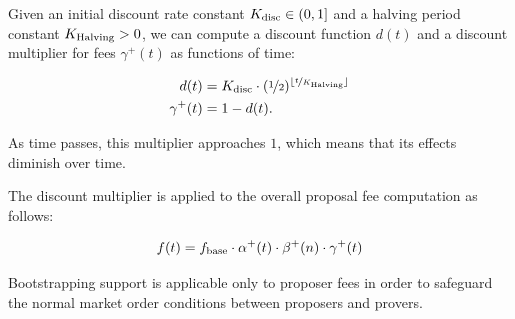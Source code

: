 \documentclass[9pt,oneside]{amsart}
\begin{document}
\begin{multicols}{2}
Given an initial discount rate constant $K_\textnormal{disc} \in (0, 1]$ and a halving period constant $K_\textnormal{Halving} > 0$, we can compute a discount function $d(t)$ and a discount multiplier for fees $\gamma^+(t)$ as functions of time:

\begin{align}
d(t) &= K_\textnormal{disc}\cdot (\nicefrac{1}{2})^{\lfloor \nicefrac{t}{K_\textnormal{Halving}}\rfloor}
\\
\gamma^+(t)  &= 1-d(t).
\end{align}

As time passes, this multiplier approaches $1$, which means that its effects diminish over time.

The discount multiplier is applied to the overall proposal fee computation as follows: 
% 
% 




\begin{align}
f(t) = f_\textnormal{base} \cdot \alpha^+(t) \cdot \beta^+(n) \cdot \gamma^+(t)
\end{align}

Bootstrapping support is applicable only to proposer fees in order to safeguard the normal market order conditions between proposers and provers.


\end{multicols}
\end{document}
